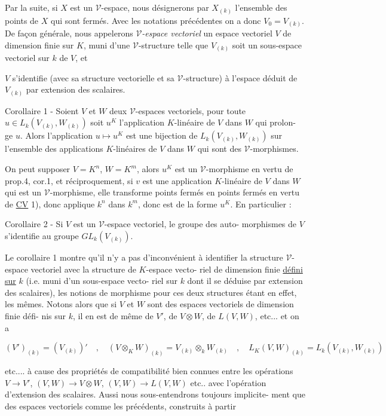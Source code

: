 Par la suite, si $X$ est un $\mathcal{V}$-espace, nous désignerons par $X_{(k)}$ l'ensemble des points de $X$ qui sont fermés. Avec les notations précédentes on a donc $V_0 = V_{(k)}$. De façon générale, nous appelerons \emph{$\mathcal{V}$-espace vectoriel} un espace vectoriel $V$ de dimension finie sur $K$, muni d'une $\mathcal{V}$-structure telle que $V_{(k)}$ soit un sous-espace vectoriel sur $k$ de $V$, et

\newpage



$V$ s'identifie (avec sa structure vectorielle et sa $\mathcal{V}$-structure) à
l'espace déduit de $V_{(k)}$ par extension des scalaires.

Corollaire 1 - Soient $V$ et $W$ deux $\mathcal{V}$-espaces vectoriels, pour toute
$u \in L_k(V_{(k)},W_{(k)})$ soit $u^K$ l'application $K$-linéaire de $V$ dans $W$ qui prolon-
ge $u$. Alors l'application $u \mapsto u^K$ est une bijection de $L_k(V_{(k)},W_{(k)})$
sur l'ensemble des applications $K$-linéaires de $V$ dans $W$ qui sont des
$\mathcal{V}$-morphismes.

On peut supposer $V=K^n$, $W=K^m$, alors $u^K$ est un $\mathcal{V}$-morphisme en vertu
de prop.4, cor.1, et réciproquement, si $v$ est une application $K$-linéaire
de $V$ dans $W$ qui est un $\mathcal{V}$-morphisme, elle transforme points fermés en
points fermés en vertu de \underline{CV} 1), donc applique $k^n$ dans $k^m$, donc est de
la forme $u^K$. En particulier :

Corollaire 2 - Si $V$ est un $\mathcal{V}$-espace vectoriel, le groupe des auto-
morphismes de $V$ s'identifie au groupe $GL_k(V_{(k)})$.

Le corollaire 1 montre qu'il n'y a pas d'inconvénient à identifier
la structure $\mathcal{V}$-espace vectoriel avec la structure de $K$-espace vecto-
riel de dimension finie \underline{défini sur} $k$ (i.e. muni d'un sous-espace vecto-
riel sur $k$ dont il se déduise par extension des scalaires), les notions
de morphisme pour ces deux structures étant en effet, les mêmes. Notons
alors que si $V$ et $W$ sont des espaces vectoriels de dimension finie défi-
nis sur $k$, il en est de même de $V'$, de $V\otimes W$, de $L(V,W)$, etc...
et on a

$$ (V')_{(k)}=(V_{(k)})' \quad , \quad (V\otimes_K W)_{(k)}=V_{(k)}\otimes_k W_{(k)} \quad , \quad L_K(V,W)_{(k)}=L_k(V_{(k)},W_{(k)}) $$

etc.... à cause des propriétés de compatibilité bien connues entre les
opérations $V \rightarrow V'$, $(V,W) \rightarrow V\otimes W$, $(V,W) \rightarrow L(V,W)$ etc.. avec l'opération
d'extension des scalaires. Aussi nous sous-entendrons toujours implicite-
ment que des espaces vectoriels comme les précédents, construits à partir

